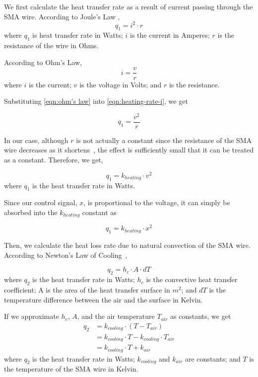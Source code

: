 We first calculate the heat transfer rate as a result of current passing through the SMA wire. According to Joule's Law \cite{JoulesLaw},
\begin{equation}
q_1 = i^2 \cdot r
\end{equation}
where $q_1$ is heat transfer rate in Watts; $i$ is the current in Amperes; $r$ is the resistance of the wire in Ohms.

According to Ohm's Law, 
\begin{equation}\label{eqn:ohm's law}
i = \frac{v}{r}
\end{equation}
where $i$ is the current; $v$ is the voltage in Volts; and $r$ is the resistance.

Substituting \eqref{eqn:ohm's law} into \eqref{eqn:heating-rate-i}, we get

\begin{equation}\label{eqn:heating-rate-v}
q_1 = \frac{v^2}{r}
\end{equation}

In our case, although $r$ is not actually a constant since the resistance of the SMA wire decreases as it shortens~\cite{FlexinolTechSpecs}, the effect is sufficiently small that it can be treated as a constant. Therefore, we get,

\begin{equation}\label{eqn:heating-rate-i}
q_1 = k_{heating} \cdot v^2
\end{equation}
where $q_1$ is the heat transfer rate in Watts.

Since our control signal, $x$, is proportional to the voltage, it can simply be absorbed into the $k_{heating}$ constant as 

\begin{equation}\label{eqn:heating-rate-x}
q_1 = k_{heating} \cdot x^2
\end{equation}

Then, we calculate the heat loss rate due to natural convection of the SMA wire. According to Newton's Law of Cooling~\cite{Burmeister1993}, 

\begin{equation}\label{eqn:cooling-newton-law}
q_2 = h_c \cdot A \cdot dT
\end{equation}
where $q_2$ is the heat transfer rate in Watts; $h_c$ is the convective heat transfer coefficient; A is the area of the heat transfer surface in $m^2$; and $dT$ is the temperature difference between the air and the surface in Kelvin.

If we approximate $h_c$, $A$, and the air temperature $T_{air}$ as constants, we get
\begin{subequations}\label{eqn:cooling-newton-law-simple}
	\begin{flalign}
	q_2 &= k_{cooling} \cdot (T - T_{air}) \\
	&= k_{cooling} \cdot T - k_{cooling} \cdot T_{air} \\
	&= k_{cooling} \cdot T + k_{air}\label{eqn:cooling-newton-law-simple-end}
	\end{flalign}
\end{subequations}
where $q_2$ is the heat transfer rate in Watts; $k_{cooling}$ and $k_{air}$ are constants; and $T$ is the temperature of the SMA wire in Kelvin.

